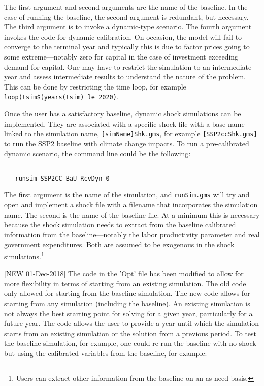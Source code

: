 The first argument and second arguments are the name of the baseline. In the
case of running the baseline, the second argument is redundant, but necessary.
The third argument is to invoke a dynamic-type scenario. The fourth argument
invokes the code for dynamic calibration. On occasion, the model will fail
to converge to the terminal year and typically this is due to factor prices
going to some extreme---notably zero for capital in the case of investment
exceeding demand for capital. One may have to restrict the simulation to an
intermediate year and assess intermediate results to understand the nature of
the problem. This can be done by restricting the time loop, for example
\texttt{loop(tsim\$(years(tsim) le 2020)}.

Once the user has a satisfactory baseline, dynamic shock simulations can be
implemented. They are associated with a specific shock file with a base name
linked to the simulation name, \texttt{[simName]Shk.gms}, for example
\texttt{[SSP2ccShk.gms]} to run the SSP2 baseline with climate change impacts.
To run a pre-calibrated dynamic scenario, the command line could be the
following:

\begin{verbatim}

   runsim SSP2CC BaU RcvDyn 0

\end{verbatim}

The first argument is the name of the simulation, and \texttt{runSim.gms} will
try and  open and implement a shock file with a filename that incorporates the
simulation name. The second is the name of the baseline file. At a minimum this
is necessary because the shock simulation needs to extract from the baseline
calibrated information from the baseline---notably the labor productivity
parameter and real government expenditures. Both are assumed to be exogenous
in the shock simulations.\footnote{Users can extract other information from
the baseline on an as-need basis.}

[NEW 01-Dec-2018] The code in the 'Opt' file has been modified to allow for
more flexibility in terms of starting from an existing simulation. The old
code only allowed for starting from the baseline simulation. The new code
allows for starting from any simulation (including the baseline). An existing
simulation is not always the best starting point for solving for a given
year, particularly for a future year. The code allows the user to provide a
year until which the simulation starts from an existing simulation or the
solution from a previous period. To test the baseline simulation, for example,
one could re-run the baseline with no shock but using the calibrated variables
from the baseline, for example:

